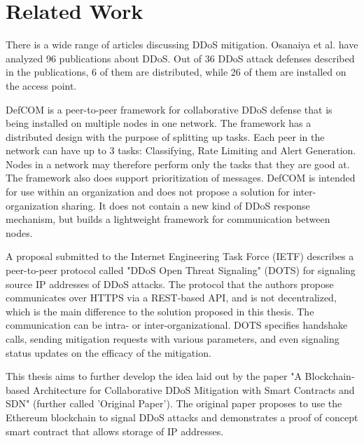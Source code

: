 \chapter{Related Work}

There is a wide range of articles discussing DDoS mitigation. Osanaiya et al. \cite{DDoSOverview} have analyzed 96 publications about DDoS. Out of 36 DDoS attack defenses described in the publications, 6 of them are distributed, while 26 of them are installed on the access point. 

DefCOM \cite{DefCOM} is a peer-to-peer framework for collaborative DDoS defense that is being installed on multiple nodes in one network. The framework has a distributed design with the purpose of splitting up tasks. Each peer in the network can have up to 3 tasks: Classifying, Rate Limiting and Alert Generation. Nodes in a network may therefore perform only the tasks that they are good at. The framework also does support prioritization of messages. DefCOM is intended for use within an organization and does not propose a solution for inter-organization sharing. It does not contain a new kind of DDoS response mechanism, but builds a lightweight framework for communication between nodes.

A proposal submitted to the Internet Engineering Task Force (IETF) \cite{IETFDraft} describes a peer-to-peer protocol called "DDoS Open Threat Signaling" (DOTS) for signaling source IP addresses of DDoS attacks. The protocol that the authors propose communicates over HTTPS via a REST-based API, and is not decentralized, which is the main difference to the solution proposed in this thesis. The communication can be intra- or  inter-organizational. DOTS specifies handshake calls, sending mitigation requests with various parameters, and even signaling status updates on the efficacy of the mitigation.

This thesis aims to further develop the idea laid out by the paper "A Blockchain-based Architecture for Collaborative DDoS Mitigation with Smart Contracts and SDN" \cite{OriginalPaper} (further called 'Original Paper'). The original paper proposes to use the Ethereum blockchain to signal DDoS attacks and demonstrates a proof of concept smart contract that allows storage of IP addresses. 

